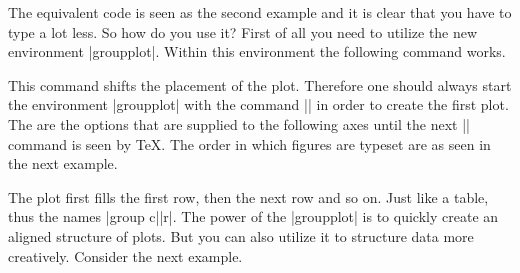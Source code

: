 The equivalent code is seen as the second example and it is clear that you have to type a lot less. So how do you use it?
First of all you need to utilize the new environment |groupplot|. Within this environment the following command works.
\begin{command}{\nextgroupplot{} }
\label{cmd:pgfplots:nextgroupplot}
This command shifts the placement of the plot. Therefore one should always start the environment |groupplot| with the command
|\nextgroupplot| in order to create the first plot. The  are the options that are supplied to the following axes until
the next |\nextgroupplot| command is seen by \TeX.
The order in which figures are typeset are as seen in the next example.
\begin{codeexample}[]
\end{codeexample}
The plot first fills the first row, then the next row and so on. Just like a table, thus the names |group c||r|. The power of the |groupplot| is
to quickly create an aligned structure of plots. But you can also utilize it to structure data more creatively. Consider the next example.
\begin{codeexample}[]
\end{codeexample}


\end{command}
